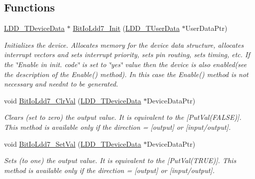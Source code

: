 \subsection*{Functions}
\begin{DoxyCompactItemize}
\item 
\hyperlink{group___p_e___types__module_gac5cf1362f1f0e3a2ce71b1bf2276d091}{L\+D\+D\+\_\+\+T\+Device\+Data} $\ast$ \hyperlink{group___bit_io_ldd7__module_gaa210933c93b15395117454a2a398c7fc}{Bit\+Io\+Ldd7\+\_\+\+Init} (\hyperlink{group___p_e___types__module_ga0b66a73f87238a782318aa0be7578e35}{L\+D\+D\+\_\+\+T\+User\+Data} $\ast$User\+Data\+Ptr)
\begin{DoxyCompactList}\small\item\em Initializes the device. Allocates memory for the device data structure, allocates interrupt vectors and sets interrupt priority, sets pin routing, sets timing, etc. If the \char`\"{}\+Enable
    in init. code\char`\"{} is set to \char`\"{}yes\char`\"{} value then the device is also enabled(see the description of the Enable() method). In this case the Enable() method is not necessary and needn\textquotesingle{}t to be generated. \end{DoxyCompactList}\item 
void \hyperlink{group___bit_io_ldd7__module_ga6eafafb0a2c30b4347462e6ff00d6f45}{Bit\+Io\+Ldd7\+\_\+\+Clr\+Val} (\hyperlink{group___p_e___types__module_gac5cf1362f1f0e3a2ce71b1bf2276d091}{L\+D\+D\+\_\+\+T\+Device\+Data} $\ast$Device\+Data\+Ptr)
\begin{DoxyCompactList}\small\item\em Clears (set to zero) the output value. It is equivalent to the \mbox{[}Put\+Val(\+F\+A\+L\+S\+E)\mbox{]}. This method is available only if the direction = {\itshape \mbox{[}output\mbox{]}} or {\itshape \mbox{[}input/output\mbox{]}}. \end{DoxyCompactList}\item 
void \hyperlink{group___bit_io_ldd7__module_gaae11392cdaf0061ec255e1de58e509f5}{Bit\+Io\+Ldd7\+\_\+\+Set\+Val} (\hyperlink{group___p_e___types__module_gac5cf1362f1f0e3a2ce71b1bf2276d091}{L\+D\+D\+\_\+\+T\+Device\+Data} $\ast$Device\+Data\+Ptr)
\begin{DoxyCompactList}\small\item\em Sets (to one) the output value. It is equivalent to the \mbox{[}Put\+Val(\+T\+R\+U\+E)\mbox{]}. This method is available only if the direction = {\itshape \mbox{[}output\mbox{]}} or {\itshape \mbox{[}input/output\mbox{]}}. \end{DoxyCompactList}\end{DoxyCompactItemize}


